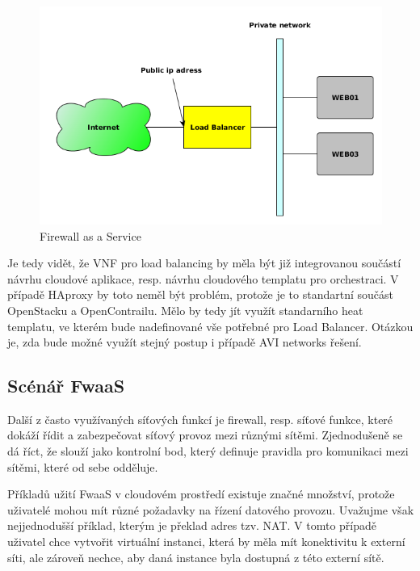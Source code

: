\begin{figure}[h]
\begin{centering}
\includegraphics[scale=0.6]{images/LoadBalancer}
\par\end{centering}
\caption{Firewall as a Service\label{fig:loadbalancer}}
\end{figure}

Je tedy vidět, že VNF pro load balancing by měla být již integrovanou součástí návrhu cloudové aplikace, resp. návrhu cloudového templatu pro orchestraci. V případě HAproxy by toto neměl být problém, protože je to standartní součást OpenStacku a OpenContrailu. Mělo by tedy jít využít standarního heat templatu, ve kterém bude nadefinované vše potřebné pro Load Balancer. Otázkou je, zda bude možné využít stejný postup i případě AVI networks řešení.

\subsection{Scénář FwaaS}

Další z často využívaných síťových funkcí je firewall, resp. síťové funkce, které dokáží řídit a zabezpečovat síťový provoz mezi různými sítěmi. Zjednodušeně se dá říct, že slouží jako kontrolní bod, který definuje pravidla pro komunikaci mezi sítěmi, které od sebe odděluje.

Příkladů užití FwaaS v cloudovém prostředí existuje značné množství, protože uživatelé mohou mít různé požadavky na řízení datového provozu. Uvažujme však nejjednodušší příklad, kterým je překlad adres tzv. NAT. V tomto případě uživatel chce vytvořit virtuální instanci, která by měla mít konektivitu k externí síti, ale zároveň nechce, aby daná instance byla dostupná z této externí sítě. 

